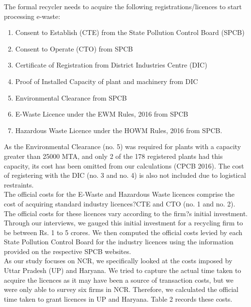 \documentclass[a4paper, 12pt]{article}
\begin{document}
                    The formal recycler needs to acquire the following registrations/licences to start processing e-waste:\\
                    \begin{enumerate}
                      \item Consent to Establish (CTE) from the State Pollution Control Board (SPCB)
                      \item Consent to Operate (CTO) from SPCB
                      \item Certificate of Registration from District Industries Centre (DIC)
                      \item Proof of Installed Capacity of plant and machinery from DIC
                      \item Environmental Clearance from SPCB 
                      \item E-Waste Licence under the EWM Rules, 2016 from SPCB
                      \item Hazardous Waste Licence under the HOWM Rules, 2016 from SPCB. 
                    \end{enumerate}
                    
                    As the Environmental Clearance (no. 5) was required for plants with a capacity greater than 25000 MTA, and only 2 of the 178 registered plants had this capacity, its cost has been omitted from our calculations (CPCB 2016). The cost of registering with the DIC (no. 3 and no. 4) is also not included due to logistical restraints. \\
                    
                    The official costs for the E-Waste and Hazardous Waste licences comprise the cost of acquiring standard industry licences?CTE and CTO (no. 1 and no. 2). The official costs for these licences vary according to the firm?s initial investment. Through our interviews, we gauged this initial investment for a recycling firm to be between Rs. 1 to 5 crores. We then computed the official costs levied by each State Pollution Control Board for the industry licences using the information provided on the respective SPCB websites. \\
                    
                    As our study focuses on NCR, we specifically looked at the costs imposed by Uttar Pradesh (UP) and Haryana. We tried to capture the actual time taken to acquire the licences as it may have been a source of transaction costs, but we were only able to survey six firms in NCR. Therefore, we calculated the official time taken to grant licences in UP and Haryana. Table 2 records these costs. 
          
\end{document}
